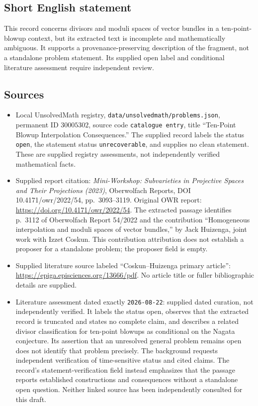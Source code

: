 \documentclass[11pt]{article}
\begin{document}
\subsection{Short English statement}
This record concerns divisors and moduli spaces of vector bundles in a ten-point-blowup context, but its extracted text is incomplete and mathematically ambiguous. It supports a provenance-preserving description of the fragment, not a standalone problem statement. Its supplied open label and conditional literature assessment require independent review.
\subsection{Sources}
\begin{itemize}
\item Local UnsolvedMath registry, \texttt{data/unsolvedmath/problems.json}, permanent ID \(30005302\), source code \texttt{catalogue entry}, title ``Ten-Point Blowup Interpolation Consequences.'' The supplied record labels the status \texttt{open}, the statement status \texttt{unrecoverable}, and supplies no clean statement. These are supplied registry assessments, not independently verified mathematical facts.
\item Supplied report citation: \emph{Mini-Workshop: Subvarieties in Projective Spaces and Their Projections (2023)}, Oberwolfach Reports, DOI 10.4171/owr/2022/54, pp.\ 3093--3119. Original OWR report: \url{https://doi.org/10.4171/owr/2022/54}. The extracted passage identifies p.\ 3112 of Oberwolfach Report 54/2022 and the contribution ``Homogeneous interpolation and moduli spaces of vector bundles,'' by Jack Huizenga, joint work with Izzet Coskun. This contribution attribution does not establish a proposer for a standalone problem; the proposer field is empty.
\item Supplied literature source labeled ``Coskun--Huizenga primary article'': \url{https://epiga.episciences.org/13666/pdf}. No article title or fuller bibliographic details are supplied.
\item Literature assessment dated exactly \texttt{2026-08-22}: supplied dated curation, not independently verified. It labels the status open, observes that the extracted record is truncated and states no complete claim, and describes a related divisor classification for ten-point blowups as conditional on the Nagata conjecture. Its assertion that an unresolved general problem remains open does not identify that problem precisely. The background requests independent verification of time-sensitive status and cited claims. The record's statement-verification field instead emphasizes that the passage reports established constructions and consequences without a standalone open question. Neither linked source has been independently consulted for this draft.
\end{itemize}
\end{document}
